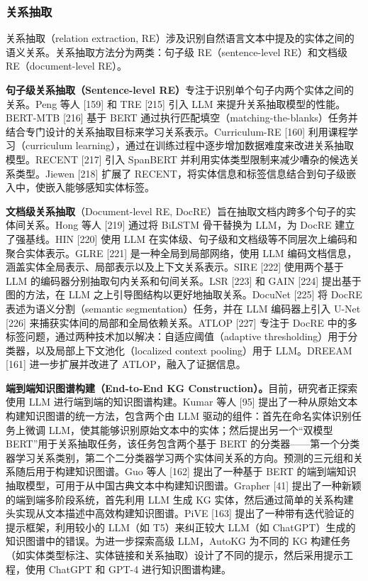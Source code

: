 \documentclass[11pt,UTF8,fontset=fandol]{ctexart}
\begin{document}
\subsubsection{关系抽取}

关系抽取（relation extraction, RE）涉及识别自然语言文本中提及的实体之间的语义关系。关系抽取方法分为两类：句子级 RE（sentence-level RE）和文档级 RE（document-level RE）。

\textbf{句子级关系抽取（Sentence-level RE）}专注于识别单个句子内两个实体之间的关系。Peng 等人 [159] 和 TRE [215] 引入 LLM 来提升关系抽取模型的性能。BERT-MTB [216] 基于 BERT 通过执行匹配填空（matching-the-blanks）任务并结合专门设计的关系抽取目标来学习关系表示。Curriculum-RE [160] 利用课程学习（curriculum learning），通过在训练过程中逐步增加数据难度来改进关系抽取模型。RECENT [217] 引入 SpanBERT 并利用实体类型限制来减少嘈杂的候选关系类型。Jiewen [218] 扩展了 RECENT，将实体信息和标签信息结合到句子级嵌入中，使嵌入能够感知实体标签。

\textbf{文档级关系抽取}（Document-level RE, DocRE）旨在抽取文档内跨多个句子的实体间关系。Hong 等人 [219] 通过将 BiLSTM 骨干替换为 LLM，为 DocRE 建立了强基线。HIN [220] 使用 LLM 在实体级、句子级和文档级等不同层次上编码和聚合实体表示。GLRE [221] 是一种全局到局部网络，使用 LLM 编码文档信息，涵盖实体全局表示、局部表示以及上下文关系表示。SIRE [222] 使用两个基于 LLM 的编码器分别抽取句内关系和句间关系。LSR [223] 和 GAIN [224] 提出基于图的方法，在 LLM 之上引导图结构以更好地抽取关系。DocuNet [225] 将 DocRE 表述为语义分割（semantic segmentation）任务，并在 LLM 编码器上引入 U-Net [226] 来捕获实体间的局部和全局依赖关系。ATLOP [227] 专注于 DocRE 中的多标签问题，通过两种技术加以解决：自适应阈值（adaptive thresholding）用于分类器，以及局部上下文池化（localized context pooling）用于 LLM。DREEAM [161] 进一步扩展并改进了 ATLOP，融入了证据信息。

\textbf{端到端知识图谱构建（End-to-End KG Construction）。}目前，研究者正探索使用 LLM 进行端到端的知识图谱构建。Kumar 等人 [95] 提出了一种从原始文本构建知识图谱的统一方法，包含两个由 LLM 驱动的组件：首先在命名实体识别任务上微调 LLM，使其能够识别原始文本中的实体；然后提出另一个``双模型 BERT''用于关系抽取任务，该任务包含两个基于 BERT 的分类器——第一个分类器学习关系类别，第二个二分类器学习两个实体间关系的方向。预测的三元组和关系随后用于构建知识图谱。Guo 等人 [162] 提出了一种基于 BERT 的端到端知识抽取模型，可用于从中国古典文本中构建知识图谱。Grapher [41] 提出了一种新颖的端到端多阶段系统，首先利用 LLM 生成 KG 实体，然后通过简单的关系构建头实现从文本描述中高效构建知识图谱。PiVE [163] 提出了一种带有迭代验证的提示框架，利用较小的 LLM（如 T5）来纠正较大 LLM（如 ChatGPT）生成的知识图谱中的错误。为进一步探索高级 LLM，AutoKG 为不同的 KG 构建任务（如实体类型标注、实体链接和关系抽取）设计了不同的提示，然后采用提示工程，使用 ChatGPT 和 GPT-4 进行知识图谱构建。
\end{document}
